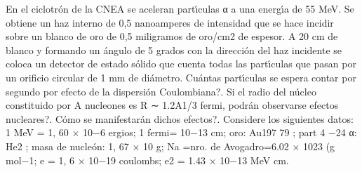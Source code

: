 \documentclass[10pt,oneside]{CBFT_book}
\begin{document}
\begin{ejercicios}
\label{ej5}
\item{ \bf }
En el ciclotrón de la CNEA se aceleran partı́culas α a una energı́a de 55 MeV. Se
obtiene un haz interno de 0,5 nanoamperes de intensidad que se hace incidir sobre un
blanco de oro de 0,5 miligramos de oro/cm2 de espesor. A 20 cm de blanco y formando
un ángulo de 5 grados con la dirección del haz incidente se coloca un detector de estado
sólido que cuenta todas las partı́culas que pasan por un orificio circular de 1 mm de
diámetro. Cuántas partı́culas se espera contar por segundo por efecto de la dispersión
Coulombiana?. Si el radio del núcleo constituido por A nucleones es R ∼ 1.2A1/3 fermi,
podrán observarse efectos nucleares?. Cómo se manifestarán dichos efectos?. Considere
los siguientes datos: 1 MeV = 1, 60 × 10−6 ergios; 1 fermi= 10−13 cm; oro: Au197
79 ; part 4 −24 α: He2 ; masa de nucleón: 1, 67 × 10 g; Na =nro. de Avogadro=6.02 × 1023 (g
mol−1; e = 1, 6 × 10−19 coulombs; e2 = 1.43 × 10−13 MeV cm.



\end{ejercicios}




\end{document}
